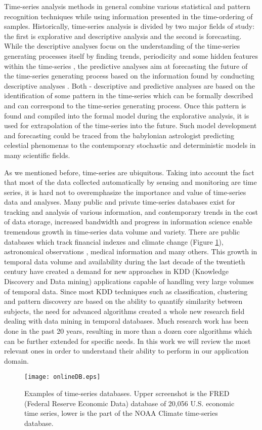 Time-series analysis methods in general combine various statistical and pattern recognition techniques while using information presented in the time-ordering of samples. Historically, time-series analysis is divided by two major fields of study: the first is explorative and descriptive analysis and the second is forecasting. 
While the descriptive analyses focus on the understanding of the time-series generating processes itself by finding trends, periodicity and some hidden features within the time-series \cite{citeulike:2206845}, the predictive analyses aim at forecasting the future of the time-series generating process based on the information found by conducting descriptive analyses \cite{citeulike:3449765}. 
Both - descriptive and predictive analyses are based on the identification of some pattern in the time-series which can be formally described and can correspond to the time-series generating process. Once this pattern is found and compiled into the formal model during the explorative analysis, it is used for extrapolation of the time-series into the future. Such  model development and forecasting could be traced from the babylonian astrologist predicting celestial phenomenas to the contemporary stochastic and deterministic models in many scientific fields.

As we mentioned before, time-series are ubiquitous. Taking into account the fact that most of the data collected automatically by sensing and monitoring are time series, it is hard not to overemphasize the importance and value of time-series data and analyses. Many public and private time-series databases exist for tracking and analysis of various information, and contemporary trends in the cost of data storage, increased bandwidth and progress in information science enable tremendous growth in time-series data volume and variety. There are public databases which track financial indexes and climate change (Figure \ref{fig:onlineDB}), astronomical observations \cite{citeulike:4373331}, medical information \cite{citeulike:4373332} and many others.  This growth in temporal data volume and availability during the last decade of the twentieth century have created a demand for new approaches in KDD (Knowledge Discovery and Data mining) applications capable of handling very large volumes of temporal data. Since most KDD techniques such as classification, clustering and pattern discovery are based on the ability to quantify similarity between subjects, the need for advanced algorithms created a whole new research field dealing with data mining in temporal databases. Much research work has been done in the past 20 years, resulting in more than a dozen core algorithms which can be further extended for specific needs. In this work we will review the most relevant ones in order to understand their ability to perform in our application domain.

\begin{figure}[tbp]
   \centering
   \texttt{[image: onlineDB.eps]}
   \caption{Examples of time-series databases. Upper screenshot is the FRED (Federal Reserve Economic Data) database of 20,056 U.S. economic time series, lower is the part of the NOAA Climate time-series database.}
   \label{fig:onlineDB}
\end{figure} 
